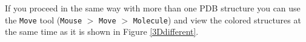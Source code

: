 \documentclass[12pt]{article}
\begin{document}
If you proceed in the same way with more than one PDB structure you can use the {\tt Move} tool ({\tt Mouse} $>$ {\tt Move} $>$ {\tt Molecule}) and view the colored structures at the same time as it is shown in Figure \ref{3Ddifferent}.

\begin{figure}[h!]
\begin{center}
\end{center}
\end{figure}
\end{document}
